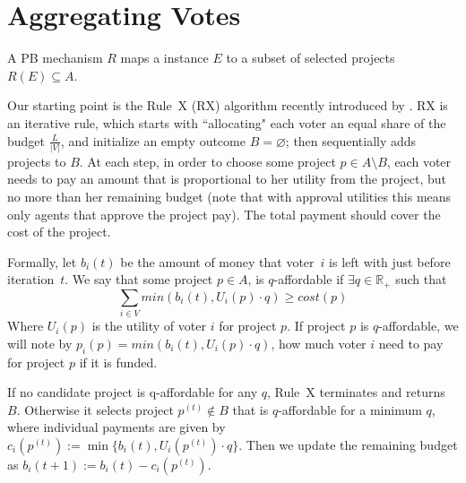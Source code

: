\documentclass[runningheads]{llncs}
\begin{document}

\section{Aggregating Votes}\label{sec:agg}

A PB mechanism $R$ maps a instance $E$ to a subset of selected projects $R(E)\subseteq A$.

Our starting point is the Rule~X (RX) algorithm recently introduced by \citet{peters2020proportional}. 
RX is an iterative rule, which starts with ``allocating" each voter an equal share of the budget $\frac{L}{|V|}$, and  initialize an empty outcome $B=\varnothing$; then sequentially adds projects to $B$. At each step, in order to choose some project $p\in A\setminus B$, each voter needs to pay an amount that is proportional to her utility from the project, but no more than her remaining budget (note that with approval utilities this means only agents that approve the project pay). The  total payment should cover the cost of the project. 
 
 Formally, let $b_i(t)$ be the amount of money that voter~$i$ is left with just before iteration~$t$.
 We say that some project $p\in A$, is $q$-affordable if $\exists q\in \mathbb{R}_+$ such that 
$$\sum_{i\in V}min(b_i(t),U_i(p)\cdot q)\geq cost(p)$$
Where $U_i(p)$ is the utility of voter $i$ for project $p$. If project $p$ is $q$-affordable, we will note by $p_i(p)=min(b_i(t),U_i(p)\cdot q)$, how much voter $i$ need to pay for project $p$ if it is funded.

If no candidate project is q-affordable for any $q$, Rule~X terminates and returns $B$. Otherwise it selects project $p^{(t)}\notin B$ that is $q$-affordable for a minimum $q$, where individual payments are given by $c_i(p^{(t)}):=\min\{b_i(t),U_i(p^{(t)})\cdot q\}$. Then we update the remaining budget as $b_i(t+1):=b_i(t)-c_i(p^{(t)})$.
\end{document}
